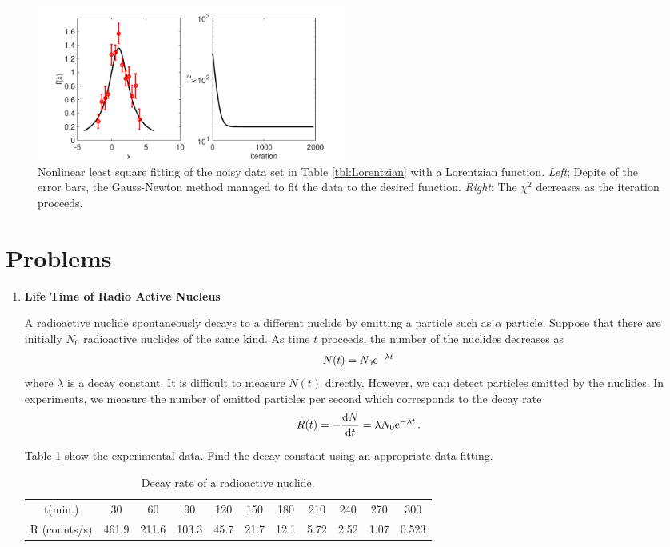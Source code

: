 \begin{figure}
\centering
\includegraphics[width=4in]{12.fitting/lorentzian.pdf}
\caption{Nonlinear least square fitting of the noisy data set in Table \ref{tbl:Lorentzian} with a Lorentzian function.  \textit{Left}; Depite of the error bars, the Gauss-Newton method managed to fit the data to the desired function. \textit{Right}:  The $\chi^2$ decreases  as the iteration proceeds.}\label{fig:Lorentzian}
\end{figure}

\newpage
\section{Problems}


\begin{enumerate}[labelwidth=0.5cm,labelindent=0cm,leftmargin=*,label=\bfseries \thechapter.\arabic*,align=left]

\item \textbf{Life Time of Radio Active Nucleus}

A radioactive nuclide spontaneously decays to a different nuclide by emitting a particle such as $\alpha$ particle.  Suppose that there are initially $N_0$ radioactive nuclides of the same kind.  As time $t$ proceeds, the number of the nuclides decreases as
\begin{equation}
N(t) = N_0 \text{e}^{-\lambda t}
\end{equation}
where $\lambda$ is a decay constant.  It is difficult to measure $N(t)$ directly.  However, we can detect particles emitted by the nuclides.  In experiments, we measure the number of emitted particles per second which corresponds to the decay rate\cite{decay_rate}
\begin{equation}
R(t) = - \frac{\text{d} N}{\text{d} t} = \lambda N_0 \text{e}^{-\lambda t}\, .
\end{equation}

Table \ref{tbl:decay_rate} show the experimental data.  Find the decay constant using an appropriate data fitting.

\begin{table}[h]
\centering
\caption{Decay rate of a radioactive nuclide.}\label{tbl:decay_rate}
\begin{tabular}{c| c c c c c c c c c c}
\hline
t(min.) & 30&    60&    90&   120 &  150 &  180&   210&   240&   270&   300 \\
R (counts/s) & 461.9&  211.6&  103.3&   45.7&   21.7&   12.1  &  5.72 &   2.52 & 1.07 &   0.523\\
\hline
\end{tabular}
\end{table}

\end{enumerate}

